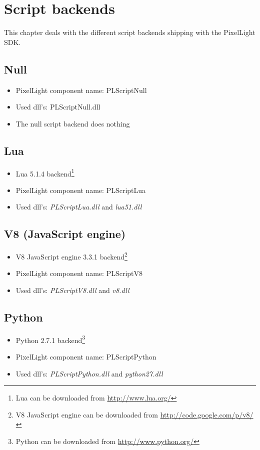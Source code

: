 \chapter{Script backends}
This chapter deals with the different script backends shipping with the PixelLight SDK.




\section{Null}
\begin{itemize}
\item PixelLight component name: PLScriptNull
\item Used dll's: PLScriptNull.dll
\item The null script backend does nothing
\end{itemize}




\section{Lua}
\begin{itemize}
\item Lua 5.1.4 backend\footnote{Lua can be downloaded from \url{http://www.lua.org/}}
\item PixelLight component name: PLScriptLua
\item Used dll's: \emph{PLScriptLua.dll} and \emph{lua51.dll}
\end{itemize}




\section{V8 (JavaScript engine)}
\begin{itemize}
\item V8 JavaScript engine 3.3.1 backend\footnote{V8 JavaScript engine can be downloaded from \url{http://code.google.com/p/v8/}}
\item PixelLight component name: PLScriptV8
\item Used dll's: \emph{PLScriptV8.dll} and \emph{v8.dll}
\end{itemize}




\section{Python}
\begin{itemize}
\item Python 2.7.1 backend\footnote{Python can be downloaded from \url{http://www.python.org/}}
\item PixelLight component name: PLScriptPython
\item Used dll's: \emph{PLScriptPython.dll} and \emph{python27.dll}
\end{itemize}
